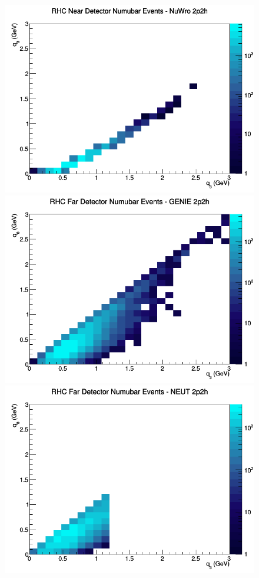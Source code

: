 \begin{figure}[h]
\includegraphics[width=\linewidth]{q0_q3/nominal/2p2h_RHC_ND_numubar_q3_q0_NuWro.png}
\endminipage
\newline
{}
\includegraphics[width=\linewidth]{q0_q3/nominal/2p2h_RHC_FD_numubar_q3_q0_GENIE.png}
\endminipage
{}
\includegraphics[width=\linewidth]{q0_q3/nominal/2p2h_RHC_FD_numubar_q3_q0_NEUT.png}

\end{figure}

